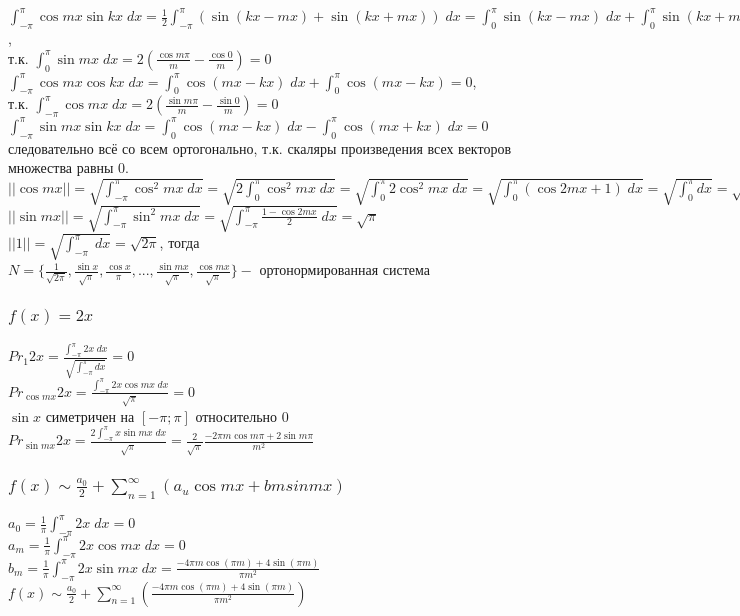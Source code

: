 \documentclass{article}
\begin{document}
    \subsubsection{}
    $\int_{-\pi}^\pi \cos mx \sin kx \; dx = \frac{1}{2} \int_{-\pi}^\pi (\sin(kx - mx) + \sin(kx + mx)) \; dx = \int_{0}^\pi \sin(kx-mx) \; dx + \int_{0}^\pi \sin(kx+mx) \; dx = 0$, \\
    т.к. $\int_{0}^\pi \sin mx \; dx = 2(\frac{\cos m \pi}{m} - \frac{\cos 0}{m}) = 0$\\
    $\int_{-\pi}^\pi \cos mx \cos kx \; dx = \int_{0}^\pi \cos(mx-kx) \; dx + \int_{0}^\pi \cos (mx-kx) = 0$, \\
    т.к. $\int_{-\pi}^\pi \cos mx \; dx = 2(\frac{\sin m \pi}{m} - \frac{\sin 0}{m}) = 0$\\
    $\int_{-\pi}^\pi \sin mx \sin kx \; dx = \int_{0}^\pi \cos(mx-kx) \; dx - \int_{0}^\pi \cos (mx+kx) \; dx = 0$\\
    следовательно всё со всем ортогонально, т.к. скаляры произведения всех векторов множества равны 0.\\
    $|| \cos mx || = \sqrt{\int_{-\pi}^\pi \cos^2 mx \; dx} = \sqrt{2\int_{0}^\pi \cos^2 mx \; dx }= \sqrt{\int_{0}^\pi 2\cos^2 mx \; dx }= \sqrt{\int_{0}^\pi (\cos 2mx + 1)\; dx} = \sqrt{\int_{0}^\pi dx} = \sqrt{\pi}$\\
    $|| \sin mx || = \sqrt{\int_{-\pi}^\pi \sin^2 mx \; dx} = \sqrt{\int_{-\pi}^\pi \frac{1 - \cos 2mx}{2} \; dx} = \sqrt{\pi}$\\
    $||1|| = \sqrt{\int_{-\pi}^\pi \; dx} = \sqrt{2 \pi}$, тогда \\
    $N = \{\frac{1}{\sqrt{2\pi}}, \frac{\sin x}{\sqrt{\pi}}, \frac{\cos x}{\pi}, ... , \frac{\sin mx}{\sqrt{\pi}}, \frac{\cos mx}{\sqrt{\pi}}\} -$ ортонормированная система
    \subsubsection{$f(x) = 2x$}
    $Pr_1 2x = \frac{\int_{-\pi}^\pi 2x \; dx}{\sqrt{\int_{-\pi}^\pi dx}} = 0$\\
    $Pr_{\cos mx} 2x = \frac{\int_{-\pi}^\pi 2x \cos mx \; dx}{\sqrt{\pi}} = 0$\\
    $\sin x$ симетричен на $[-\pi;\pi]$ относительно $0$\\
    $Pr_{\sin mx} 2x = \frac{2 \int_{-\pi}^\pi x \sin mx \; dx}{\sqrt{\pi}} = \frac{2}{\sqrt{\pi}} \frac{-2 \pi m \cos m \pi + 2 \sin m \pi}{m^2}$
    \subsubsection{$f(x) \sim \frac{a_0}{2} + \sum_{n=1}^{\infty}(a_u \cos mx + bm sin mx)$}
    $a_0 = \frac{1}{\pi} \int_{-\pi}^\pi 2x \; dx = 0$\\
    $a_m = \frac{1}{\pi} \int_{-\pi}^\pi 2x \cos mx \; dx = 0$\\
    $b_m = \frac{1}{\pi} \int_{-\pi}^\pi 2x \sin mx \; dx = \frac{-4\pi m \cos(\pi m) + 4 \sin (\pi m)}{\pi m^2}$\\
    $f(x) \sim \frac{a_0}{2} + \sum_{n=1}^{\infty}(\frac{-4\pi m \cos(\pi m) + 4 \sin (\pi m)}{\pi m^2})$
    
\end{document}
